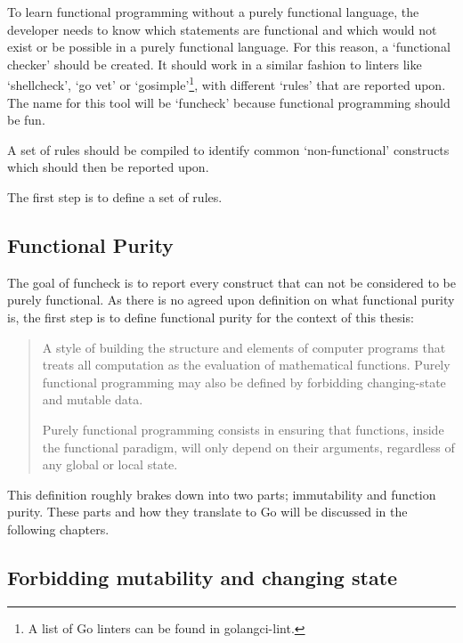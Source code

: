 To learn functional programming without a purely functional language, the
developer needs to know which statements are functional and which
would not exist or be possible in a purely functional language.
For this reason, a `functional checker' should be created. It should work
in a similar fashion to linters like `shellcheck', `go vet' or `gosimple'\footnote{
    A list of Go linters can be found in golangci-lint\autocite{golangci-lint}.
}, with different `rules' that are reported upon. The name for this tool
will be `funcheck' because functional programming should be fun.

A set of rules should be compiled to identify common `non-functional' constructs
which should then be reported upon.

The first step is to define a set of rules.

\subsection{Functional Purity}\label{sec:func-purity}

The goal of funcheck is to report every construct that can not be considered
to be purely functional. As there is no agreed upon definition on what
functional purity is\autocite{functional-controversy}, the first step is to
define functional purity for the context of this thesis:

\begin{quote}
    A style of building the structure and elements of computer programs that
    treats all computation as the evaluation of mathematical functions. Purely
    functional programming may also be defined by forbidding changing-state and
    mutable data.

    Purely functional programming consists in ensuring that functions, inside
    the functional paradigm, will only depend on their arguments, regardless of
    any global or local state.\autocite{functional-purity-wiki}
\end{quote}

This definition roughly brakes down into two parts; immutability and function
purity. These parts and how they translate to Go will be discussed in the
following chapters.

\subsection{Forbidding mutability and changing state}\label{sec:mutability}


